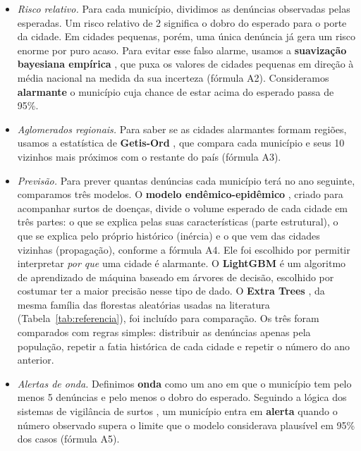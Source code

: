 \documentclass[12pt]{article}
\begin{document}
\begin{itemize}
\item \textit{Risco relativo.} Para cada município, dividimos as denúncias observadas pelas esperadas. Um risco relativo de 2 significa o dobro do esperado para o porte da cidade. Em cidades pequenas, porém, uma única denúncia já gera um risco enorme por puro acaso. Para evitar esse falso alarme, usamos a \textbf{suavização bayesiana empírica} \cite{marshall:1991}, que puxa os valores de cidades pequenas em direção à média nacional na medida da sua incerteza (fórmula A2). Consideramos \textbf{alarmante} o município cuja chance de estar acima do esperado passa de 95\%.
\item \textit{Aglomerados regionais.} Para saber se as cidades alarmantes formam regiões, usamos a estatística de \textbf{Getis-Ord} \cite{getis_ord:1992}, que compara cada município e seus 10 vizinhos mais próximos com o restante do país (fórmula A3).
\item \textit{Previsão.} Para prever quantas denúncias cada município terá no ano seguinte, comparamos três modelos. O \textbf{modelo endêmico-epidêmico} \cite{held_hohle_hofmann:2005}, criado para acompanhar surtos de doenças, divide o volume esperado de cada cidade em três partes: o que se explica pelas suas características (parte estrutural), o que se explica pelo próprio histórico (inércia) e o que vem das cidades vizinhas (propagação), conforme a fórmula A4. Ele foi escolhido por permitir interpretar \textit{por que} uma cidade é alarmante. O \textbf{LightGBM} \cite{ke:2017} é um algoritmo de aprendizado de máquina baseado em árvores de decisão, escolhido por costumar ter a maior precisão nesse tipo de dado. O \textbf{Extra Trees} \cite{geurts:2006}, da mesma família das florestas aleatórias usadas na literatura (Tabela~\ref{tab:referencia}), foi incluído para comparação. Os três foram comparados com regras simples: distribuir as denúncias apenas pela população, repetir a fatia histórica de cada cidade e repetir o número do ano anterior.
\item \textit{Alertas de onda.} Definimos \textbf{onda} como um ano em que o município tem pelo menos 5 denúncias e pelo menos o dobro do esperado. Seguindo a lógica dos sistemas de vigilância de surtos \cite{farrington:1996}, um município entra em \textbf{alerta} quando o número observado supera o limite que o modelo considerava plausível em 95\% dos casos (fórmula A5).
\end{itemize}
\end{document}

